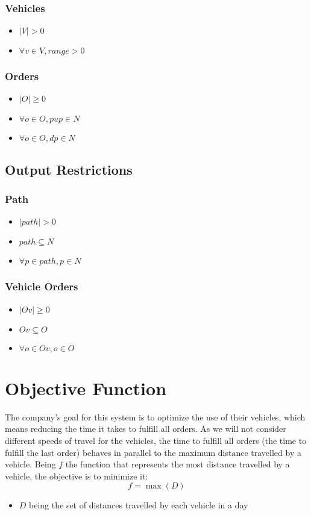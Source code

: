 \subsubsection{Vehicles}
\begin{itemize}
    \item $ |V| > 0 $
    \item $ \forall v \in V, range > 0 $
\end{itemize}

\subsubsection{Orders}
\begin{itemize}
    \item $ |O| \geq 0 $
    \item $ \forall o \in O, pup \in N $
    \item $ \forall o \in O, dp \in N $
\end{itemize}


\subsection{Output Restrictions}

\subsubsection{Path}
\begin{itemize}
    \item $ |path| > 0 $
    \item $ path \subseteq N $
    \item $ \forall p \in path, p \in N $
\end{itemize}

\subsubsection{Vehicle Orders}
\begin{itemize}
    \item $ |Ov| \geq 0 $
    \item $ Ov \subseteq O $
    \item $ \forall o \in Ov, o \in O$
\end{itemize}



\section{Objective Function}

The company's goal for this system is to optimize the use of their vehicles, which means reducing the time it takes to fulfill all orders. As we will not consider different speeds of travel for the vehicles, the time to fulfill all orders (the time to fulfill the last order) behaves in parallel to the maximum distance travelled by a vehicle. Being $ f $ the function that represents the most distance travelled by a vehicle, the objective is to minimize it:
\[ f = \max(D) \]
\begin{itemize}
    \item $ D $ being the set of distances travelled by each vehicle in a day
\end{itemize}
